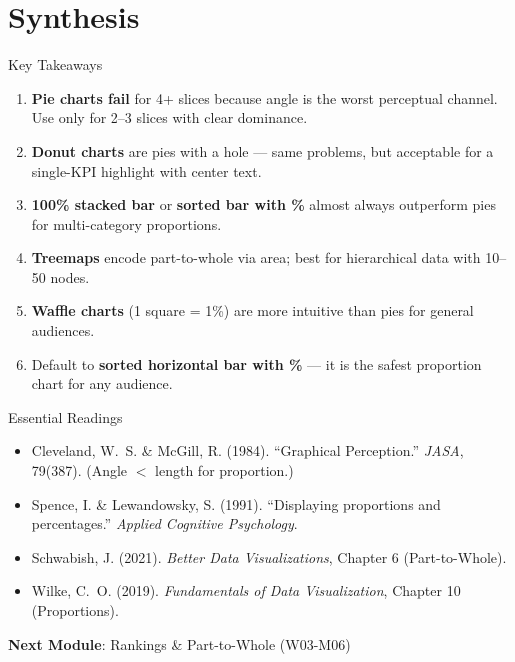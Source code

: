 \documentclass[10pt]{beamer}
\begin{document}
\section{Synthesis}

\begin{frame}{Key Takeaways}
  \begin{enumerate}
    \item \textbf{Pie charts fail} for 4+ slices because angle is the
          worst perceptual channel. Use only for 2--3 slices with clear
          dominance.
    \item \textbf{Donut charts} are pies with a hole --- same problems,
          but acceptable for a single-KPI highlight with center text.
    \item \textbf{100\% stacked bar} or \textbf{sorted bar with \%}
          almost always outperform pies for multi-category proportions.
    \item \textbf{Treemaps} encode part-to-whole via area; best for
          hierarchical data with 10--50 nodes.
    \item \textbf{Waffle charts} (1 square = 1\%) are more intuitive
          than pies for general audiences.
    \item Default to \textbf{sorted horizontal bar with \%} --- it is
          the safest proportion chart for any audience.
  \end{enumerate}
\end{frame}

\begin{frame}{Essential Readings}
  \begin{itemize}
    \item Cleveland, W.~S. \& McGill, R. (1984). ``Graphical Perception.''
          \emph{JASA}, 79(387). (Angle $<$ length for proportion.)
    \item Spence, I. \& Lewandowsky, S. (1991). ``Displaying proportions
          and percentages.'' \emph{Applied Cognitive Psychology}.
    \item Schwabish, J. (2021). \emph{Better Data Visualizations},
          Chapter 6 (Part-to-Whole).
    \item Wilke, C.~O. (2019). \emph{Fundamentals of Data Visualization},
          Chapter 10 (Proportions).
  \end{itemize}
  \vspace{6pt}
  \textbf{Next Module}: Rankings \& Part-to-Whole (W03-M06)
\end{frame}
\end{document}
